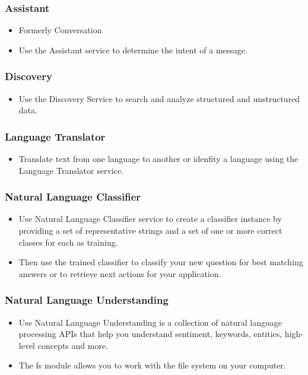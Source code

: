 \documentclass[11pt]{beamer}
\begin{document}
\begin{frame}
	\frametitle{Assistant}
	\begin{itemize}
		\item Formerly Conversation
		\item Use the Assistant service to determine the intent of a message.
	\end{itemize}
	
\end{frame}

\begin{frame}
	\frametitle{Discovery}
	\begin{itemize}
		\item Use the Discovery Service to search and analyze structured and unstructured data.
	\end{itemize}
	
\end{frame}

\begin{frame}
\frametitle{Language Translator}
	\begin{itemize}
		\item Translate text from one language to another or idenfity a language using the Language Translator service.
	\end{itemize}
	
\end{frame}

\begin{frame}
	\frametitle{Natural Language Classifier}
	\begin{itemize}
		\item Use Natural Language Classifier service to create a classifier instance by providing a set of representative strings and a set of one or more correct classes for each as training. 
		\item Then use the trained classifier to classify your new question for best matching answers or to retrieve next actions for your application.
	\end{itemize}
	
\end{frame}

\begin{frame}
	\frametitle{Natural Language Understanding}
	\begin{itemize}
		\item Use Natural Language Understanding is a collection of natural language processing APIs that help you understand sentiment, keywords, entities, high-level concepts and more.
		\item The fs module allows you to work with the file system on your computer.
	\end{itemize}
	
\end{frame}
\end{document}
